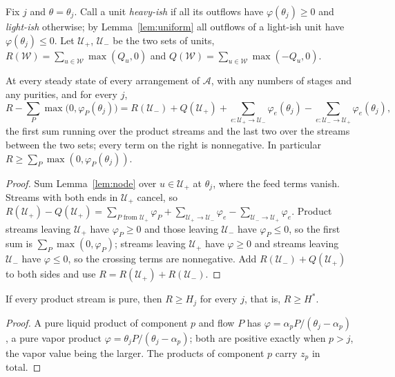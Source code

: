 \documentclass[11pt,a4paper]{report}
\newcommand{\cA}{\mathcal A}
\newcommand{\Hs}{H^{*}}
\begin{document}
Fix \(j\) and \(\theta=\theta_j\). Call a unit \emph{heavy-ish} if all its outflows have \(\varphi(\theta_j)\ge0\) and
\emph{light-ish} otherwise; by Lemma~\ref{lem:uniform} all outflows of a light-ish unit have \(\varphi(\theta_j)\le0\). Let
\(\mathcal U_+\), \(\mathcal U_-\) be the two sets of units, \(R(\mathcal W)=\sum_{u\in\mathcal W}\max(Q_u,0)\) and
\(Q(\mathcal W)=\sum_{u\in\mathcal W}\max(-Q_u,0)\).

\begin{theorem}\label{thm:stage}
At every steady state of every arrangement of \(\cA\), with any numbers of stages and any purities, and for every \(j\),
\begin{equation}\label{eq:defect}
R-\sum_P\max\bigl(0,\varphi_P(\theta_j)\bigr)=R(\mathcal U_-)+Q(\mathcal U_+)
+\sum_{e\colon\mathcal U_+\to\mathcal U_-}\varphi_e(\theta_j)-\sum_{e\colon\mathcal U_-\to\mathcal U_+}\varphi_e(\theta_j),
\end{equation}
the first sum running over the product streams and the last two over the streams between the two sets; every term on
the right is nonnegative. In particular \(R\ge\sum_P\max(0,\varphi_P(\theta_j))\).
\end{theorem}
\begin{proof}
Sum Lemma~\ref{lem:node} over \(u\in\mathcal U_+\) at \(\theta_j\), where the feed terms vanish. Streams with both ends in
\(\mathcal U_+\) cancel, so
\(R(\mathcal U_+)-Q(\mathcal U_+)=\sum_{P\text{ from }\mathcal U_+}\varphi_P+\sum_{\mathcal U_+\to\mathcal U_-}\varphi_e-\sum_{\mathcal U_-\to\mathcal U_+}\varphi_e\).
Product streams leaving \(\mathcal U_+\) have \(\varphi_P\ge0\) and those leaving \(\mathcal U_-\) have \(\varphi_P\le0\), so the first
sum is \(\sum_P\max(0,\varphi_P)\); streams leaving \(\mathcal U_+\) have \(\varphi\ge0\) and streams leaving \(\mathcal U_-\) have
\(\varphi\le0\), so the crossing terms are nonnegative. Add \(R(\mathcal U_-)+Q(\mathcal U_+)\) to both sides and use
\(R=R(\mathcal U_+)+R(\mathcal U_-)\).
\end{proof}

\begin{corollary}\label{cor:pure}
If every product stream is pure, then \(R\ge H_j\) for every \(j\), that is, \(R\ge\Hs\).
\end{corollary}
\begin{proof}
A pure liquid product of component \(p\) and flow \(P\) has \(\varphi=\alpha_pP/(\theta_j-\alpha_p)\), a pure vapor product
\(\varphi=\theta_jP/(\theta_j-\alpha_p)\); both are positive exactly when \(p>j\), the vapor value being the larger. The products
of component \(p\) carry \(z_p\) in total.
\end{proof}
\end{document}
